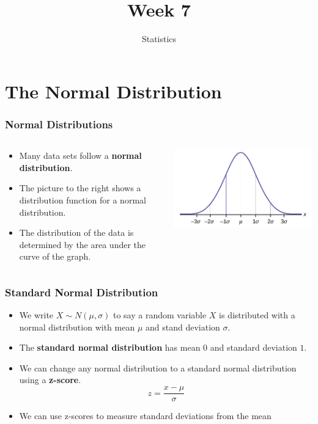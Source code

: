 \documentclass[12pt,twocolumn]{article}
\title{Week 7}
\author{Statistics}
\date{}
\begin{document}
\begin{frame}
 \titlepage
\end{frame}

\section{The Normal Distribution}

\begin{frame}[t]
 \frametitle{Normal Distributions}
 \begin{columns}
  \begin{column}{0.5\textwidth}
    \begin{itemize}
     \item Many data sets follow a \textbf{normal distribution}.
     \item The picture to the right shows a distribution function for a normal distribution.
     \item The distribution of the data is determined by the area under the curve of the graph.
    \end{itemize}
  \end{column}
  \begin{column}{0.5\textwidth}
    \includegraphics[width=\linewidth]{normal_distribution.jpg}
  \end{column}
 \end{columns}
\end{frame}

\begin{frame}[t]
 \frametitle{Standard Normal Distribution}
 \begin{itemize}
  \item We write $X \sim N(\mu, \sigma)$ to say a random variable $X$ is distributed with a normal distribution with mean $\mu$ and stand deviation $\sigma$.
  \item The \textbf{standard normal distribution} has mean $0$ and standard deviation $1$.
  \item We can change any normal distribution to a standard normal distribution using a \textbf{z-score}.
  $$z = \frac{x - \mu}{\sigma}$$
  \item We can use z-scores to measure standard deviations from the mean
 \end{itemize}
\end{frame}
\end{document}
